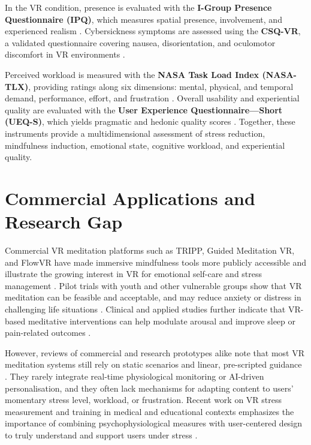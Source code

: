 In the VR condition, presence is evaluated with the \textbf{I-Group Presence Questionnaire (IPQ)}, which measures spatial presence, involvement, and experienced realism \cite{schubert2001ipq}. Cybersickness symptoms are assessed using the \textbf{CSQ-VR}, a validated questionnaire covering nausea, disorientation, and oculomotor discomfort in VR environments \cite{kourtesis2019csqvr}. 

Perceived workload is measured with the \textbf{NASA Task Load Index (NASA-TLX)}, providing ratings along six dimensions: mental, physical, and temporal demand, performance, effort, and frustration \cite{hart1988nasatlx}. Overall usability and experiential quality are evaluated with the \textbf{User Experience Questionnaire—Short (UEQ-S)}, which yields pragmatic and hedonic quality scores \cite{schrepp2017ueqs}. Together, these instruments provide a multidimensional assessment of stress reduction, mindfulness induction, emotional state, cognitive workload, and experiential quality.

\section{Commercial Applications and Research Gap}
Commercial VR meditation platforms such as TRIPP, Guided Meditation VR, and FlowVR have made immersive mindfulness tools more publicly accessible and illustrate the growing interest in VR for emotional self-care and stress management \cite{ghosal2025vrmindfulness}. Pilot trials with youth and other vulnerable groups show that VR meditation can be feasible and acceptable, and may reduce anxiety or distress in challenging life situations \cite{chavez2020youth}. Clinical and applied studies further indicate that VR-based meditative interventions can help modulate arousal and improve sleep or pain-related outcomes \cite{zambotti2022insomnia,sarkar2022vrpain,kim2024stress}.

However, reviews of commercial and research prototypes alike note that most VR meditation systems still rely on static scenarios and linear, pre-scripted guidance \cite{ghosal2025vrmindfulness}. They rarely integrate real-time physiological monitoring or AI-driven personalisation, and they often lack mechanisms for adapting content to users’ momentary stress level, workload, or frustration. Recent work on VR stress measurement and training in medical and educational contexts emphasizes the importance of combining psychophysiological measures with user-centered design to truly understand and support users under stress \cite{rubio2025stress,rodrigues2021IMVEST}.

